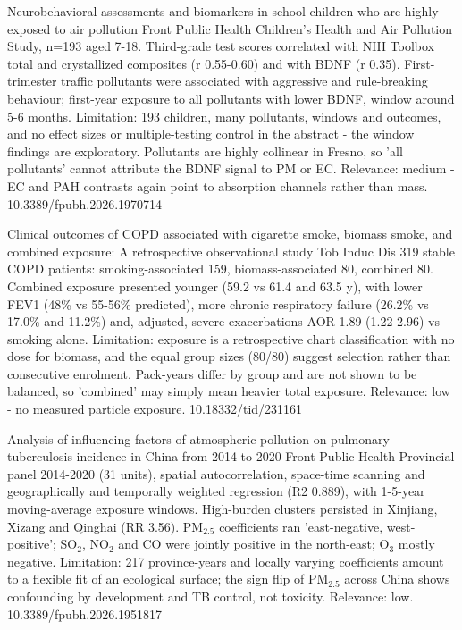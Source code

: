 \documentclass[10pt]{article}
\begin{document}
{Neurobehavioral assessments and biomarkers in school children who are highly exposed to air pollution}
{Front Public Health}
{Children's Health and Air Pollution Study, n=193 aged 7-18. Third-grade test scores correlated with NIH Toolbox total and crystallized composites (r 0.55-0.60) and with BDNF (r 0.35). First-trimester traffic pollutants were associated with aggressive and rule-breaking behaviour; first-year exposure to all pollutants with lower BDNF, window around 5-6 months. Limitation: 193 children, many pollutants, windows and outcomes, and no effect sizes or multiple-testing control in the abstract - the window findings are exploratory. Pollutants are highly collinear in Fresno, so 'all pollutants' cannot attribute the BDNF signal to PM or EC. Relevance: medium - EC and PAH contrasts again point to absorption channels rather than mass.}
{10.3389/fpubh.2026.1970714}

\par{}\baselineskip{}\baselineskip
{}

{Clinical outcomes of COPD associated with cigarette smoke, biomass smoke, and combined exposure: A retrospective observational study}
{Tob Induc Dis}
{319 stable COPD patients: smoking-associated 159, biomass-associated 80, combined 80. Combined exposure presented younger (59.2 vs 61.4 and 63.5 y), with lower FEV1 (48\% vs 55-56\% predicted), more chronic respiratory failure (26.2\% vs 17.0\% and 11.2\%) and, adjusted, severe exacerbations AOR 1.89 (1.22-2.96) vs smoking alone. Limitation: exposure is a retrospective chart classification with no dose for biomass, and the equal group sizes (80/80) suggest selection rather than consecutive enrolment. Pack-years differ by group and are not shown to be balanced, so 'combined' may simply mean heavier total exposure. Relevance: low - no measured particle exposure.}
{10.18332/tid/231161}

{Analysis of influencing factors of atmospheric pollution on pulmonary tuberculosis incidence in China from 2014 to 2020}
{Front Public Health}
{Provincial panel 2014-2020 (31 units), spatial autocorrelation, space-time scanning and geographically and temporally weighted regression (R2 0.889), with 1-5-year moving-average exposure windows. High-burden clusters persisted in Xinjiang, Xizang and Qinghai (RR 3.56). PM$_{2.5}$ coefficients ran 'east-negative, west-positive'; SO$_2$, NO$_2$ and CO were jointly positive in the north-east; O$_3$ mostly negative. Limitation: 217 province-years and locally varying coefficients amount to a flexible fit of an ecological surface; the sign flip of PM$_{2.5}$ across China shows confounding by development and TB control, not toxicity. Relevance: low.}
{10.3389/fpubh.2026.1951817}
\end{document}
